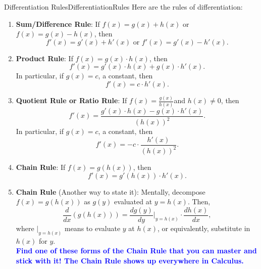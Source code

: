 \begin{propColor}{Differentiation Rules}{DifferentiationRules}
Here are the rules of differentiation:

   \begin{enumerate}
   \renewcommand{\labelenumi}{(\alph{enumi})}
    \setlength{\itemsep}{.2cm}

    \item \textbf{Sum/Difference Rule}: 
    If $f(x) = g(x) + h(x)$ or $f(x) = g(x) - h(x)$, then
   $$f'(x) = g'(x) + h'(x) \text{ or } f'(x) = g'(x) - h'(x). $$

    \item \textbf{Product Rule}: 
    If $f(x) = g(x) \cdot h(x)$, then
   $$f'(x) = g'(x) \cdot  h(x) + g(x) \cdot h'(x). $$
    In particular, if $g(x) = c$, a constant, then
     $$f'(x) = c \cdot h'(x). $$

    \item \textbf{Quotient Rule or Ratio Rule}: 
    If $f(x) = \frac{g(x)}{h(x)} $and $h(x) \neq 0$, then
   $$f'(x) = \frac{g'(x) \cdot h(x) - g(x) \cdot h'(x)}{\left(h(x) \right)^2}. $$
   In particular, if $g(x) = c$, a constant, then
   $$f'(x) = -c \cdot \frac{h'(x)}{\left(h(x) \right)^2}. $$

    \item \textbf{Chain Rule}: 
    If $f(x) = g(h(x)) $, then
   $$f'(x) = g'(h(x)) \cdot h'(x) .$$

          \item \textbf{Chain Rule} (Another way to state it): Mentally, decompose $f(x) = g(h(x))$ as $g(y)$ evaluated at $y = h(x)$. Then, 
   $$ \frac{d}{dx}\left( g(h(x)) \right) =  \frac{dg(y)}{dy}\Big|_{y = h(x)} \cdot \frac{dh(x)}{dx}, $$
   where $\Big|_{y = h(x)}$ means to evaluate $y$ at $h(x)$, or equivalently, substitute in $h(x)$ for $y$. \\
   
   \textcolor{blue}{\bf Find one of these forms of the Chain Rule that you can master and stick with it! The Chain Rule shows up everywhere in Calculus.}




\end{enumerate}
\end{propColor}
